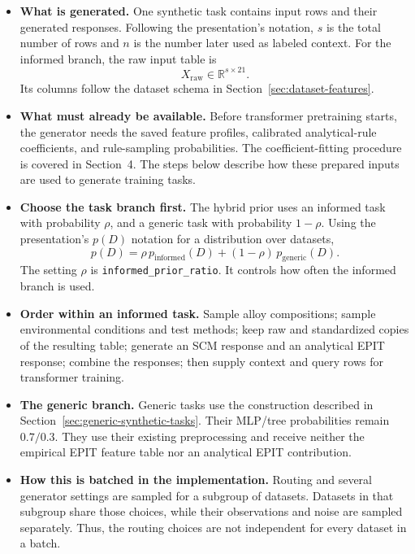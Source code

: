 \documentclass[11pt]{article}
\newenvironment{notes}
  {\begin{itemize}\setlength{\itemsep}{0.45em}\setlength{\parsep}{0pt}}
  {\end{itemize}}
\begin{document}
\begin{notes}
    \item \textbf{What is generated.} One synthetic task contains
    input rows and their generated responses. Following the
    presentation's notation, \(s\) is the total number of rows and
    \(n\) is the number later used as labeled context. For the
    informed branch, the raw input table is
    \[
        X_{\mathrm{raw}}\in\mathbb{R}^{s\times21}.
    \]
    Its columns follow the dataset schema in
    Section~\ref{sec:dataset-features}.

    \item \textbf{What must already be available.} Before transformer
    pretraining starts, the generator needs the saved feature
    profiles, calibrated analytical-rule coefficients, and
    rule-sampling probabilities. The coefficient-fitting procedure
    is covered in Section~4. The steps below describe how these
    prepared inputs are used to generate training tasks.

    \item \textbf{Choose the task branch first.} The hybrid prior
    uses an informed task with probability \(\rho\), and a generic
    task with probability \(1-\rho\). Using the presentation's
    \(p(D)\) notation for a distribution over datasets,
    \begin{equation}
        p(D)=\rho\,p_{\mathrm{informed}}(D)
             +(1-\rho)\,p_{\mathrm{generic}}(D).
        \label{eq:hybrid-task-distribution}
    \end{equation}
    The setting \(\rho\) is
    \texttt{informed\_prior\_ratio}. It controls how often the
    informed branch is used.

    \item \textbf{Order within an informed task.} Sample alloy
    compositions; sample environmental conditions and test methods;
    keep raw and standardized copies of the resulting table;
    generate an SCM response and an analytical EPIT response;
    combine the responses; then supply context and query rows
    for transformer training.

    \item \textbf{The generic branch.} Generic tasks use the
    construction described in Section~\ref{sec:generic-synthetic-tasks}.
    Their MLP/tree probabilities remain \(0.7/0.3\).
    They use their existing preprocessing and receive neither the
    empirical EPIT feature table nor an analytical EPIT contribution.

    \item \textbf{How this is batched in the implementation.}
    Routing and several generator settings are sampled for a
    subgroup of datasets. Datasets in that subgroup share those
    choices, while their observations and noise are sampled
    separately. Thus, the routing choices are not independent
    for every dataset in a batch.
\end{notes}
\end{document}
